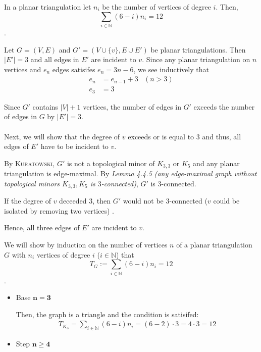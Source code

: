 \documentclass[a4paper]{article}
\begin{document}
	\begin{solution}{17}
		\begin{theorem}{In a planar triangulation let $n_i$ be the number of vertices of degree $i$. Then, \begin{equation*}\sum_{i \in \mathbb{N}} (6 - i)n_i = 12 \end{equation*}.}
			\begin{lemma}{Let $G = (V, E)$ and $G' = (V \cup \{v\}, E \cup E')$ be planar triangulations. Then $|E'| = 3$ and all edges in $E'$ are incident to $v$.}
			Since any planar triangulation on $n$ vertices and $e_n$ edges satisifes $e_n = 3n - 6$, we see inductively that
			\begin{align*}
				e_n &= e_{n-1} + 3& (n > 3)\\
				e_3 &= 3
			\end{align*}
			
			Since $G'$ contains $|V| + 1$ vertices, the number of edges in $G'$ exceeds the number of edges in $G$ by  $|E'| = 3$.\\
			\ \\
			Next, we will show that the degree of $v$ exceeds or is equal to $3$ and thus, all edges of $E'$ have to be incident to $v$.

			By \textsc{Kuratowski}, $G'$ is not a topological minor of $K_{3,3}$ or $K_5$ and any planar triangulation is edge-maximal. By \emph{Lemma 4.4.5 (any edge-maximal graph without topological minors $K_{3,3}, K_5$ is $3$-connected)}, $G'$ is $3$-connected.

			If the degree of $v$ deceeded $3$, then $G'$ would not be $3$-connected ($v$ could be isolated by removing two vertices) .
			
			Hence, all three edges of $E'$ are incident to $v$.
			\end{lemma}
			
			We will show by induction on the number of vertices $n$ of a planar triangulation $G$ with $n_i$ vertices of degree $i$ ($i \in \mathbb{N}$) that 
			\begin{equation*}
				T_G := \sum_{i \in \mathbb{N}} (6 - i)n_i = 12
			\end{equation*}
	.
	
			\begin{itemize}
				\item Base $\mathbf{n = 3}$
					
					Then, the graph is a triangle and the condition is satisifed:
					\begin{align*}
						T_{K_3} = \sum_{i \in \mathbb{N}} (6 - i)n_i = (6-2) \cdot 3 = 4 \cdot 3 = 12
					\end{align*}
				\item Step $\mathbf{n \geq 4}$
					

\end{itemize}
\end{theorem}
\end{solution}
\end{document}
